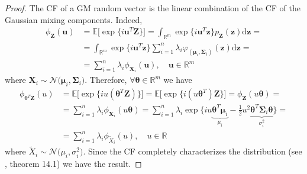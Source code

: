 \begin{proof}
	The \gls{CF} of a \gls{GM} random vector is the linear combination of the \gls{CF} of the Gaussian mixing components. Indeed, 
	\begin{align*}
	\phi_{\bm{Z}}(\bm{u}) &= \mathbb{E}\big[\exp\{i \bm{u}^T \bm{Z}\} \big] = \int_{\mathbb{R}^m}\exp\{i \bm{u}^T \bm{z}\}p_{\bm{Z}}(\bm{z})\mathrm{d}\bm{z} = \\
	& = \int_{\mathbb{R}^m}\exp\{i \bm{u}^T \bm{z}\}\sum_{i=1}^{n}\lambda_i \varphi_{(\bm{\mu}_i,\bm{\Sigma}_i)}(\bm{z})\mathrm{d}\bm{z} = \\
	& = \sum_{i=1}^{n}\lambda_i \phi_{\bm{X}_i}(\bm{u}), \quad \bm{u} \in \mathbb{R}^m
	\end{align*}
	where $\bm{X}_i \sim \mathcal{N}\big(\bm{\mu}_i,\bm{\Sigma}_i\big)$. Therefore, $\forall \bm{\theta} \in \mathbb{R}^m$ we have
	\begin{align*}
	\phi_{\bm{\theta}^T \bm{Z}}(u) & = \mathbb{E}\big[\exp\{iu(\bm{\theta}^T\bm{Z})\}\big] = \mathbb{E}\big[\exp\{i(u\bm{\theta}^T)\bm{Z}\}\big] = 
    \phi_{\bm{Z}}(u\bm{\theta}) = \\
    & = \sum_{i=1}^{n}\lambda_i \phi_{\bm{X}_i}(u\bm{\theta}) = \sum_{i=1}^{n}\lambda_i \exp\{iu\underbrace{\bm{\theta}^T\bm{\mu}_i}_{\mu_i}-\frac{1}{2}u^2\underbrace{\bm{\theta}^T\bm{\Sigma}_i\bm{\theta}}_{\sigma_i^2}\} = \\
	& = \sum_{i=1}^{n}\lambda_i \phi_{\widetilde{X}_i}(u), \quad u \in \mathbb{R}
	\end{align*}
	where $\widetilde{X}_i \sim \mathcal{N}\big(\mu_i,\sigma_i^2 \big)$. Since the CF completely characterizes the distribution (see \cite{jacod2000probability}, theorem 14.1) we have the result.
\end{proof}


